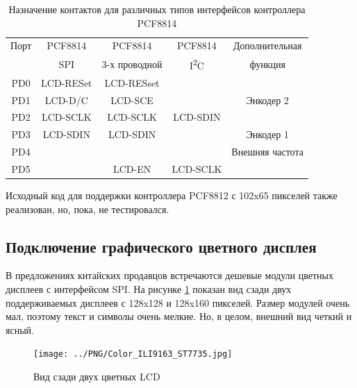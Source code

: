 \begin{table}[H]
  \begin{center}
    \begin{tabular}{| c || c | c | c | c |}
    \hline
     Порт  &  PCF8814    & PCF8814        & PCF8814     & Дополнительная \\
           &    SPI      & 3-х проводной  & I\textsuperscript{2}C  & функция \\
    \hline
    \hline
    PD0    &   LCD-RESet  & LCD-RESset       &            & \\
    \hline
    PD1    &   LCD-D/C   & LCD-SCE        &             & Энкодер 2 \\
    \hline
    PD2    &   LCD-SCLK  & LCD-SCLK       &  LCD-SDIN   & \\
    \hline
    PD3    &   LCD-SDIN  & LCD-SDIN       &             & Энкодер 1 \\
    \hline
    PD4    &             &                &             & Внешняя частота \\
    \hline
    PD5    &             & LCD-EN         &   LCD-SCLK  & \\
    \hline
    \end{tabular}
  \end{center}
  \caption{Назначение контактов для различных типов интерфейсов контроллера PCF8814}
  \label{tab:PCF8814-con}
\end{table}

Исходный код для поддержки контроллера PCF8812 с 102x65 пикселей также реализован, 
но, пока, не тестировался.

\subsection{Подключение графического цветного дисплея}

В предложениях китайских продавцов встречаются дешевые модули цветных дисплеев с интерфейсом SPI.
На рисунке \ref{fig:Color_both} показан вид сзади двух поддерживаемых дисплеев с 128x128 и 
128x160 пикселей.
Размер модулей очень мал, поэтому текст и символы очень мелкие.
Но, в целом, внешний вид четкий и ясный.

\begin{figure}[H]
\centering
\texttt{[image: ../PNG/Color\_ILI9163\_ST7735.jpg]}
\caption{Вид сзади двух цветных LCD}
\label{fig:Color_both}
\end{figure}

